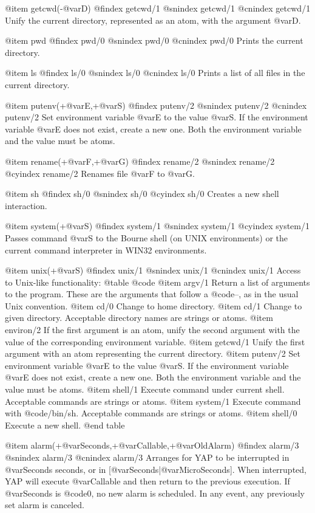 {{{{{{@item getcwd(-@var{D})
@findex getcwd/1
@snindex getcwd/1
@cnindex getcwd/1
Unify the current directory, represented as an atom, with the argument
@var{D}.

@item pwd
@findex pwd/0
@snindex pwd/0
@cnindex pwd/0
Prints the current directory.

@item ls
@findex ls/0
@snindex ls/0
@cnindex ls/0
Prints a list of all files in the current directory.

@item putenv(+@var{E},+@var{S})
@findex putenv/2
@snindex putenv/2
@cnindex putenv/2
Set environment variable @var{E} to the value @var{S}. If the
environment variable @var{E} does not exist, create a new one. Both the
environment variable and the value must be atoms.

@item rename(+@var{F},+@var{G})
@findex rename/2
@snindex rename/2
@cyindex rename/2
Renames file @var{F} to @var{G}.

@item sh
@findex sh/0
@snindex sh/0
@cyindex sh/0
Creates a new shell interaction.

@item system(+@var{S})
@findex system/1
@snindex system/1
@cyindex system/1
Passes command @var{S} to the Bourne shell (on UNIX environments) or the
current command interpreter in WIN32 environments.

@item unix(+@var{S})
@findex unix/1
@snindex unix/1
@cnindex unix/1
Access to Unix-like functionality:
@table @code
@item argv/1
Return a list of arguments to the program. These are the arguments that
follow a @code{--}, as in the usual Unix convention.
@item cd/0
Change to home directory.
@item cd/1
Change to given directory. Acceptable directory names are strings or
atoms.
@item environ/2
If the first argument is an atom, unify the second argument with the
value of the corresponding environment variable.
@item getcwd/1
Unify the first argument with an atom representing the current directory.
@item putenv/2
Set environment variable @var{E} to the value @var{S}. If the
environment variable @var{E} does not exist, create a new one. Both the
environment variable and the value must be atoms.
@item shell/1
Execute command under current shell. Acceptable commands are strings or
atoms.
@item system/1
Execute command with @code{/bin/sh}. Acceptable commands are strings or
atoms.
@item shell/0
Execute a new shell.
@end table

@item alarm(+@var{Seconds},+@var{Callable},+@var{OldAlarm})
@findex alarm/3
@snindex alarm/3
@cnindex alarm/3
Arranges for YAP to be interrupted in @var{Seconds} seconds, or in
[@var{Seconds}|@var{MicroSeconds}]. When interrupted, YAP will execute
@var{Callable} and then return to the previous execution. If
@var{Seconds} is @code{0}, no new alarm is scheduled. In any event,
any previously set alarm is canceled.

}}}}}}
